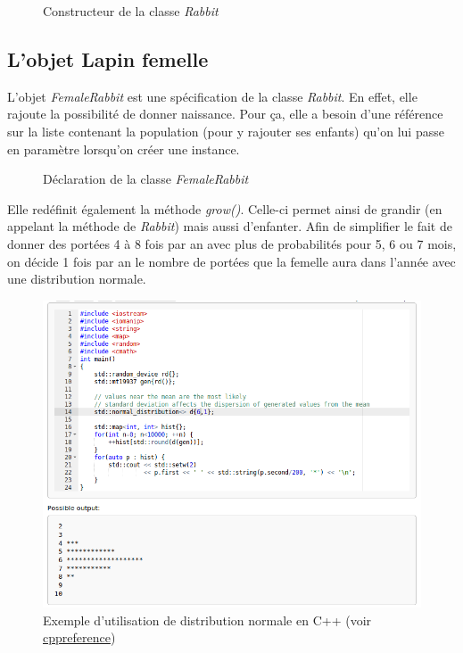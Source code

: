 \documentclass{article}
\begin{document}
\begin{figure}[!h]
  \caption{Constructeur de la classe \emph{Rabbit}}
  
\end{figure}

\newpage
\subsection{L'objet Lapin femelle}
L'objet \emph{FemaleRabbit} est une spécification de la classe \emph{Rabbit}. En effet, elle
rajoute la possibilité de donner naissance. Pour ça, elle a besoin d'une référence sur la
liste contenant la population (pour y rajouter ses enfants) qu'on lui passe en paramètre
lorsqu'on créer une instance.

\begin{figure}[!h]
  \caption{Déclaration de la classe \emph{FemaleRabbit}}
  
\end{figure}

Elle redéfinit également la méthode \emph{grow()}. Celle-ci permet ainsi de grandir
(en appelant la méthode de \emph{Rabbit}) mais aussi d'enfanter. Afin de simplifier le
fait de donner des portées 4 à 8 fois par an avec plus de probabilités pour 5, 6 ou 7 mois,
on décide 1 fois par an le nombre de portées que la femelle aura dans l'année avec une
distribution normale.

\begin{figure}[!h]
  \centering
  \caption{Exemple d'utilisation de distribution normale en C++ (voir \href{https://en.cppreference.com/w/cpp/numeric/random/normal\_distribution}{cppreference})}
  \includegraphics[scale=0.5]{normal_dist.png}
\end{figure}
\end{document}
